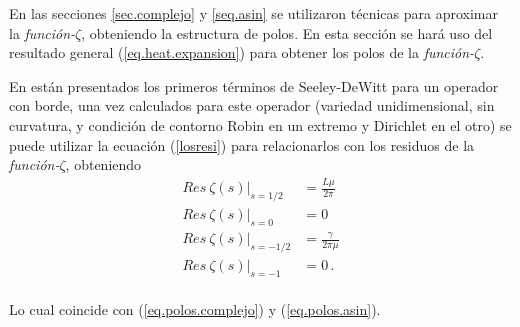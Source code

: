 En las secciones \ref{sec.complejo} y \ref{seq.asin} se utilizaron técnicas para aproximar la {\it función-$\zeta$}, obteniendo la estructura de polos. En esta sección se hará uso del resultado general (\ref{eq.heat.expansion}) para obtener los polos de la {\it función-$\zeta$}.

En \cite{Vassilevich:2003xt} están presentados los primeros términos de Seeley-DeWitt para un operador con borde, una vez calculados para este operador (variedad unidimensional, sin curvatura, y condición de contorno Robin en un extremo y Dirichlet en el otro) se puede utilizar la ecuación (\ref{losresi}) para relacionarlos con los residuos de la {\it función-$\zeta$}, obteniendo
\begin{equation}
\begin{aligned}
Res \  \zeta  (s)  | _{s=1/2} &= \frac{L \mu}{2 \pi} \\[5pt]
Res \  \zeta  (s)  | _{s=0} &= 0 \\[5pt]
Res \ \zeta (s) | _{s=-1/2} &= \frac{\gamma}{2 \pi \mu} \\[5pt]
Res \  \zeta  (s) | _{s=-1} &= 0 \, . \\[5pt]
\end{aligned}
\end{equation}


Lo cual coincide con (\ref{eq.polos.complejo}) y (\ref{eq.polos.asin}).
